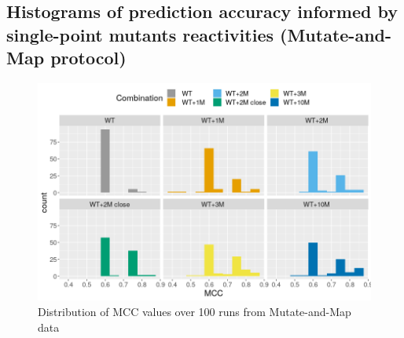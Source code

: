 \documentclass[11pt]{article} %
\begin{document}
%

\subsection{Histograms of prediction accuracy informed by single-point mutants reactivities (Mutate-and-Map protocol)}
\begin{figure}[H]
\includegraphics[width=\linewidth]{graphs/histog1}
\caption{Distribution of MCC values over 100 runs from Mutate-and-Map data}
\end{figure}


%


\end{document}

